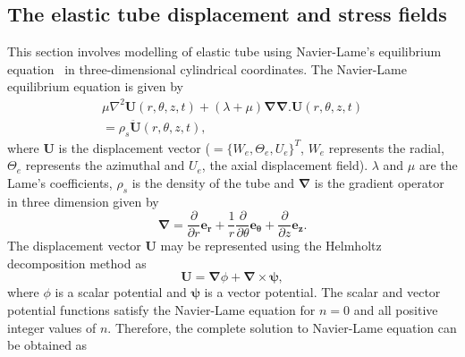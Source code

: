 \documentclass[twocolumn,10pt]{asme2ej}
\begin{document}
\subsection{The elastic tube displacement and stress fields}\label{governing equation for 3d cylinder}
This section involves modelling of elastic tube using Navier-Lame's equilibrium equation~\cite{Martin2014} in three-dimensional cylindrical coordinates. The Navier-Lame equilibrium equation is given by
\begin{multline}\label{Navier equation of motion 3d}
    \mu\nabla^{2}\mathbf{U}(r,\theta,z,t)+(\lambda+\mu)\pmb{\nabla}\pmb{\nabla}.\mathbf{U}(r,\theta,z,t)\\ = \rho_s\mathbf{\ddot{U}}(r,\theta,z,t),
\end{multline}
where $\mathbf{U}$ is the displacement vector ($= \{W_e, \Theta_e, U_e\}^T$, $W_e$ represents the radial, $\Theta_e$ represents the azimuthal and $U_e$, the axial displacement field). $\lambda$ and $\mu$ are the Lame's coefficients, $\rho_s$ is the density of the tube and $\pmb{\nabla}$ is the gradient operator in three dimension given by
\begin{equation}\label{del operator}
    \pmb{\nabla} = \frac{\partial}{\partial r}{\mathbf{e_r}} + \frac{1}{r}\frac{\partial}{\partial \theta}\mathbf{e}_{\pmb{\theta}} + \frac{\partial}{\partial z}\mathbf{e_z}.
\end{equation}
The displacement vector $\mathbf{U}$ may be represented using the Helmholtz decomposition method as
 \begin{equation}\label{Helmholtz equation 3d}
    \mathbf{U} = \pmb{\nabla}\phi+\pmb{\nabla}\times\pmb{\psi},
\end{equation}
where $\phi$ is a scalar potential and $\pmb{\psi}$ is a vector potential. 
The scalar and vector potential functions satisfy the Navier-Lame equation for $n=0$ and all positive integer values of $n$. Therefore, the complete solution to Navier-Lame equation can be obtained as
\end{document}
